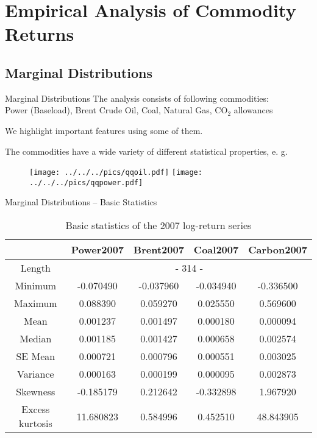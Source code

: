 \section{Empirical Analysis of Commodity Returns}
\subsection{Marginal Distributions}

{Marginal Distributions}
The analysis consists of following commodities:\\
Power (Baseload), Brent Crude Oil, Coal, Natural Gas, CO$_2$
allowances

We highlight important features using some of them.

The commodities have a wide variety of different statistical
properties, e. g.
\begin{center}
\begin{figure}
\texttt{[image: ../../../pics/qqoil.pdf]}
\texttt{[image: ../../../pics/qqpower.pdf]}
\end{figure}
\end{center}


{Marginal Distributions -- Basic Statistics}
{\small
\begin{table}[ht]
            \vspace{0.5cm}
            \begin{center}
                \begin{tabular}{c|c|c|c|c}
                    &Power2007&Brent2007&Coal2007&Carbon2007\\\hline
                    Length&\multicolumn{4}{c}{- 314 -}\\
                    Minimum&-0.070490&-0.037960&-0.034940&-0.336500\\
                    Maximum&0.088390&0.059270&0.025550&0.569600\\
                    Mean&0.001237&0.001497&0.000180&0.000094\\
                    Median&0.001185&0.001427&0.000658&0.002574\\
                    SE Mean&0.000721&0.000796&0.000551&0.003025\\
                    Variance&0.000163&0.000199&0.000095&0.002873\\
                    Skewness&-0.185179&0.212642&-0.332898&1.967920\\
                    Excess kurtosis&11.680823&0.584996&0.452510&48.843905\\
                \end{tabular}
                \caption{Basic statistics of the 2007 log-return series}
            \end{center}
        \end{table}
}





